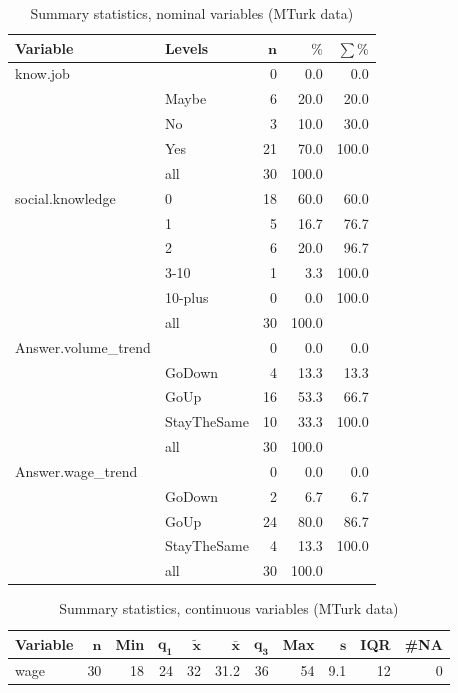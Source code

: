 \documentclass[a4paper,10pt]{article}\usepackage[]{graphicx}\usepackage[]{color}
\begin{document}
\begin{table}[ht]
\centering
{\footnotesize
\begin{tabular}{ll|rrr}
 \textbf{Variable} & \textbf{Levels} & $\mathbf{n}$ & $\mathbf{\%}$ & $\mathbf{\sum \%}$ \\ 
  \hline
know.job &  & 0 & 0.0 & 0.0 \\ 
   & Maybe & 6 & 20.0 & 20.0 \\ 
   & No & 3 & 10.0 & 30.0 \\ 
   & Yes & 21 & 70.0 & 100.0 \\ 
   \hline
 & all & 30 & 100.0 &  \\ 
   \hline
\hline
social.knowledge & 0 & 18 & 60.0 & 60.0 \\ 
   & 1 & 5 & 16.7 & 76.7 \\ 
   & 2 & 6 & 20.0 & 96.7 \\ 
   & 3-10 & 1 & 3.3 & 100.0 \\ 
   & 10-plus & 0 & 0.0 & 100.0 \\ 
   \hline
 & all & 30 & 100.0 &  \\ 
   \hline
\hline
Answer.volume\_trend &  & 0 & 0.0 & 0.0 \\ 
   & GoDown & 4 & 13.3 & 13.3 \\ 
   & GoUp & 16 & 53.3 & 66.7 \\ 
   & StayTheSame & 10 & 33.3 & 100.0 \\ 
   \hline
 & all & 30 & 100.0 &  \\ 
   \hline
\hline
Answer.wage\_trend &  & 0 & 0.0 & 0.0 \\ 
   & GoDown & 2 & 6.7 & 6.7 \\ 
   & GoUp & 24 & 80.0 & 86.7 \\ 
   & StayTheSame & 4 & 13.3 & 100.0 \\ 
   \hline
 & all & 30 & 100.0 &  \\ 
   \hline
\hline
\end{tabular}
}
\caption{Summary statistics, nominal variables (MTurk data)} 
\label{tab1:13-2050}
\end{table}
\begin{table}[ht]
\centering
{\footnotesize
\begin{tabular}{lrrrrrrrrrr}
 \textbf{Variable} & $\mathbf{n}$ & \textbf{Min} & $\mathbf{q_1}$ & $\mathbf{\widetilde{x}}$ & $\mathbf{\bar{x}}$ & $\mathbf{q_3}$ & \textbf{Max} & $\mathbf{s}$ & \textbf{IQR} & \textbf{\#NA} \\ 
  \hline
wage & 30 & 18 & 24 & 32 & 31.2 & 36 & 54 & 9.1 & 12 & 0 \\ 
  \end{tabular}
}
\caption{Summary statistics, continuous variables (MTurk data)} 
\label{tab2:13-2050}
\end{table}
\end{document}
